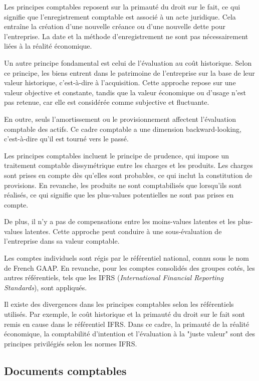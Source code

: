 \documentclass[a4paper, 12pt]{report}
\begin{document}
Les principes comptables reposent sur la primauté du droit sur le fait, ce qui signifie que l'enregistrement comptable est associé à un acte juridique. Cela entraîne la création d'une nouvelle créance ou d'une nouvelle dette pour l'entreprise. La date et la méthode d'enregistrement ne sont pas nécessairement liées à la réalité économique.

Un autre principe fondamental est celui de l'évaluation au coût historique. Selon ce principe, les biens entrent dans le patrimoine de l'entreprise sur la base de leur valeur historique, c'est-à-dire à l'acquisition. Cette approche repose sur une valeur objective et constante, tandis que la valeur économique ou d'usage n'est pas retenue, car elle est considérée comme subjective et fluctuante.

En outre, seuls l'amortissement ou le provisionnement affectent l'évaluation comptable des actifs. Ce cadre comptable a une dimension backward-looking, c'est-à-dire qu'il est tourné vers le passé.

Les principes comptables incluent le principe de prudence, qui impose un traitement comptable dissymétrique entre les charges et les produits. Les charges sont prises en compte dès qu'elles sont probables, ce qui inclut la constitution de provisions. En revanche, les produits ne sont comptabilisés que lorsqu'ils sont réalisés, ce qui signifie que les plus-values potentielles ne sont pas prises en compte.

De plus, il n'y a pas de compensations entre les moins-values latentes et les plus-values latentes. Cette approche peut conduire à une sous-évaluation de l'entreprise dans sa valeur comptable.

Les comptes individuels sont régis par le référentiel national, connu sous le nom de French GAAP. En revanche, pour les comptes consolidés des groupes cotés, les autres référentiels, tels que les IFRS (\textit{International Financial Reporting Standards}), sont appliqués.

Il existe des divergences dans les principes comptables selon les référentiels utilisés. Par exemple, le coût historique et la primauté du droit sur le fait sont remis en cause dans le référentiel IFRS. Dans ce cadre, la primauté de la réalité économique, la comptabilité d'intention et l'évaluation à la "juste valeur" sont des principes privilégiés selon les normes IFRS.

\subsection{Documents comptables}
\end{document}
